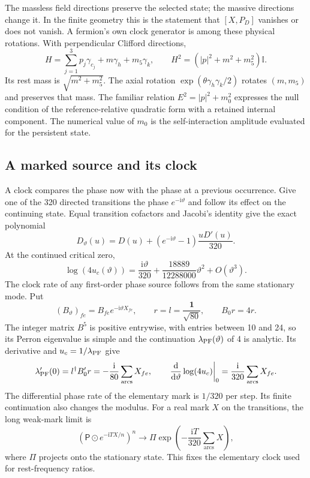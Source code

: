 \documentclass[aps,prx,onecolumn,10pt,notitlepage,nofootinbib,longbibliography]{revtex4-2}
\numberwithin{equation}{section}
\numberwithin{table}{section}
\newcommand{\Id}{\mathbb I}
\newcommand{\dd}{\mathrm d}
\newcommand{\ii}{\mathrm i}
\begin{document}
The massless field directions preserve the selected state; the massive directions change it. In the finite geometry this is the statement that $[X,P_D]$ vanishes or does not vanish. A fermion's own clock generator is among these physical rotations. With perpendicular Clifford directions,
\begin{equation}
 H=\sum_{j=1}^3p_j\gamma_{c_j}+m\gamma_h+m_5\gamma_k,
 \qquad H^2=(|p|^2+m^2+m_5^2)\Id.
 \label{eq:fermiondispersion}
\end{equation}
Its rest mass is $\sqrt{m^2+m_5^2}$. The axial rotation $\exp(\theta\gamma_h\gamma_k/2)$ rotates $(m,m_5)$ and preserves that mass. The familiar relation $E^2=|p|^2+m_0^2$ expresses the null condition of the reference-relative quadratic form with a retained internal component. The numerical value of $m_0$ is the self-interaction amplitude evaluated for the persistent state.

\subsection{A marked source and its clock}
A clock compares the phase now with the phase at a previous occurrence. Give one of the 320 directed transitions the phase $e^{-\ii\vartheta}$ and follow its effect on the continuing state. Equal transition cofactors and Jacobi's identity give the exact polynomial
\begin{equation}
 D_\vartheta(u)=D(u)+(e^{-\ii\vartheta}-1)\frac{uD'(u)}{320}.
\end{equation}
At the continued critical zero,
\begin{equation}
 \log(4u_c(\vartheta))=
 \frac{\ii\vartheta}{320}
 +\frac{18889}{12288000}\vartheta^2+O(\vartheta^3).
 \label{eq:marked}
\end{equation}
The clock rate of any first-order phase source follows from the same stationary mode. Put
\begin{equation}
 (B_\vartheta)_{fe}=B_{fe}e^{-\ii\vartheta X_{fe}},\qquad
 r=l=\frac{\mathbf1}{\sqrt{80}},\qquad B_0r=4r.
\end{equation}
The integer matrix $B^5$ is positive entrywise, with entries between 10 and 24, so its Perron eigenvalue is simple and the continuation $\lambda_{\rm PF}(\vartheta)$ of 4 is analytic. Its derivative and $u_c=1/\lambda_{\rm PF}$ give
\begin{equation}
 \lambda_{\rm PF}'(0)=l^\dagger B'_0r
 =-\frac{\ii}{80}\sum_{\mathrm{arcs}}X_{fe},\qquad
 \left.\frac{\dd}{\dd\vartheta}\log(4u_c)\right|_0
 =\frac{\ii}{320}\sum_{\mathrm{arcs}}X_{fe}.
 \label{eq:markedsourceclock}
\end{equation}
The differential phase rate of the elementary mark is $1/320$ per step. Its finite continuation also changes the modulus. For a real mark $X$ on the transitions, the long weak-mark limit is
\begin{equation}
 (\mathsf P\odot e^{-\ii TX/n})^n
 \longrightarrow \Pi\exp\!\left(-\frac{\ii T}{320}\sum_{\mathrm{arcs}}X\right),
\end{equation}
where $\Pi$ projects onto the stationary state. This fixes the elementary clock used for rest-frequency ratios.
\end{document}
